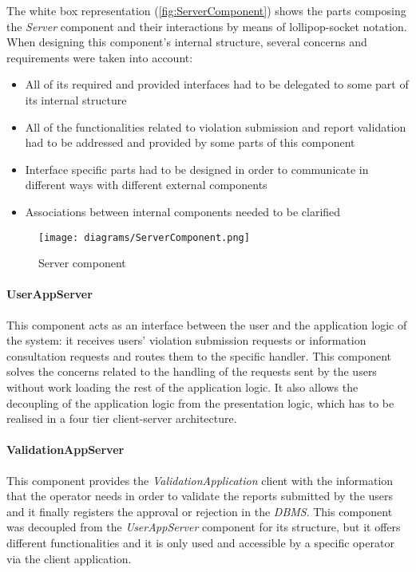 The white box representation (\autoref{fig:ServerComponent}) shows the parts composing the \emph{Server} component and their interactions by means of lollipop-socket notation. When designing this component's internal structure, several concerns and requirements were taken into account:
\begin{itemize}
	\item All of its required and provided interfaces had to be delegated to some part of its internal structure
	\item All of the functionalities related to violation submission and report validation had to be addressed and provided by some parts of this component
	\item Interface specific parts had to be designed in order to communicate in different ways with different external components
	\item Associations between internal components needed to be clarified
\end{itemize}

\begin{figure}[h]
	\centering
	\texttt{[image: diagrams/ServerComponent.png]}
	\caption{
	\label{fig:ServerComponent} 
		Server component
	}
\end{figure}

\paragraph{UserAppServer}
This component acts as an interface between the user and the application logic of the system: it receives users' violation submission requests or information consultation requests and routes them to the specific handler. This component solves the concerns related to the handling of the requests sent by the users without work loading the rest of the application logic. It also allows the decoupling of the application logic from the presentation logic, which has to be realised in a four tier client-server architecture.
\paragraph{ValidationAppServer}
This component provides the \textit{ValidationApplication} client with the information that the operator needs in order to validate the reports submitted by the users and it finally registers the approval or rejection in the \textit{DBMS}. This component was decoupled from the \textit{UserAppServer} component for its structure, but it offers different functionalities and it is only used and accessible by a specific operator via the client application.
